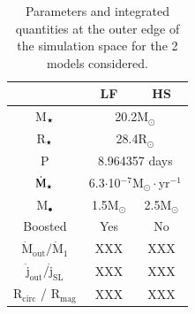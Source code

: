 \documentclass{aa}
\newcommand{\mystar}{{\fontfamily{lmr}\selectfont$\star$}}
\begin{document}
\begin{table}
\centering
\caption{Parameters and integrated quantities at the outer edge of the simulation space for the 2 models considered.}
\label{tab:params}
\begin{tabularx}{\linewidth}{c|c|c}
   & LF & HS \\
  \hline
  M$_{\text{\mystar}}$ & \multicolumn{2}{c}{20.2M$_{\odot}$} \\
  R$_{\text{\mystar}}$ & \multicolumn{2}{c}{28.4R$_{\odot}$} \\
  P & \multicolumn{2}{c}{8.964357 days} \\  
  $\dot{\text{M}}_{\text{\mystar}}$ & \multicolumn{2}{c}{6.3$\cdot$10$^{-7}$M$_{\odot}\cdot$yr$^{-1}$} \\
  \hline
  M$_{\bullet}$ & 1.5M$_{\odot}$  & 2.5M$_{\odot}$  \\
  Boosted & Yes & No  \\
  \hline
  $\dot{\text{M}}_{\text{out}}/\dot{\text{M}}_1$ & XXX & XXX  \\
  $\dot{\text{j}}_{\text{out}}/\dot{\text{j}}_{\text{SL}}$ & XXX & XXX \\
  R$_{\text{circ}}$ / R$_{\text{mag}}$ & XXX & XXX \\
\end{tabularx}
\end{table}
\end{document}
